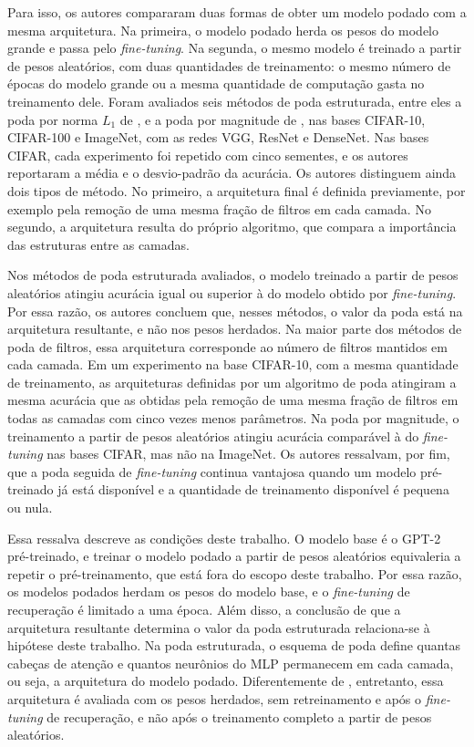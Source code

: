 Para isso, os autores compararam duas formas de obter um modelo podado com a mesma arquitetura.
Na primeira, o modelo podado herda os pesos do modelo grande e passa pelo \textit{fine-tuning}.
Na segunda, o mesmo modelo é treinado a partir de pesos aleatórios, com duas quantidades de
treinamento: o mesmo número de épocas do modelo grande ou a mesma quantidade de computação gasta
no treinamento dele. Foram avaliados seis métodos de poda estruturada, entre eles a poda por
norma $L_1$ de , e a poda por magnitude de , nas bases
CIFAR-10, CIFAR-100 e ImageNet, com as redes VGG, ResNet e DenseNet. Nas bases CIFAR, cada
experimento foi repetido com cinco sementes, e os autores reportaram a média e o desvio-padrão da
acurácia. Os autores distinguem ainda dois tipos de método. No primeiro, a arquitetura final é
definida previamente, por exemplo pela remoção de uma mesma fração de filtros em cada camada. No
segundo, a arquitetura resulta do próprio algoritmo, que compara a importância das estruturas
entre as camadas.

Nos métodos de poda estruturada avaliados, o modelo treinado a partir de pesos aleatórios
atingiu acurácia igual ou superior à do modelo obtido por \textit{fine-tuning}. Por essa razão,
os autores concluem que, nesses métodos, o valor da poda está na arquitetura resultante, e não
nos pesos herdados. Na maior parte dos métodos de poda de filtros, essa arquitetura corresponde
ao número de filtros mantidos em cada camada. Em um experimento na base CIFAR-10, com a mesma
quantidade de treinamento, as arquiteturas definidas por um algoritmo de poda atingiram a mesma
acurácia que as obtidas pela remoção de uma mesma fração de filtros em todas as camadas com
cinco vezes menos parâmetros. Na poda por magnitude, o treinamento a partir de pesos aleatórios
atingiu acurácia comparável à do \textit{fine-tuning} nas bases CIFAR, mas não na ImageNet. Os
autores ressalvam, por fim, que a poda seguida de \textit{fine-tuning} continua vantajosa quando
um modelo pré-treinado já está disponível e a quantidade de treinamento disponível é pequena ou
nula.

Essa ressalva descreve as condições deste trabalho. O modelo base é o GPT-2 pré-treinado, e
treinar o modelo podado a partir de pesos aleatórios equivaleria a repetir o pré-treinamento,
que está fora do escopo deste trabalho. Por essa razão, os modelos podados herdam os
pesos do modelo base, e o \textit{fine-tuning} de recuperação é limitado a uma época.
Além disso, a conclusão de que a arquitetura resultante determina
o valor da poda estruturada relaciona-se à hipótese deste trabalho.
Na poda estruturada, o esquema de poda define quantas
cabeças de atenção e quantos neurônios do MLP permanecem em cada camada, ou seja, a arquitetura
do modelo podado. Diferentemente de , entretanto, essa arquitetura é
avaliada com os pesos herdados, sem retreinamento e após o \textit{fine-tuning} de recuperação,
e não após o treinamento completo a partir de pesos aleatórios.

